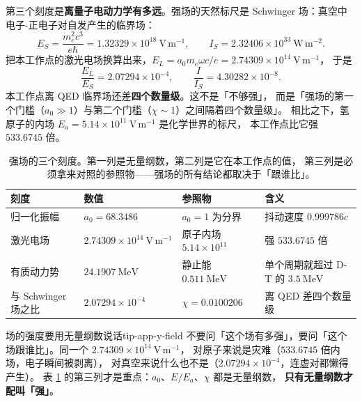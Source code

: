 第三个刻度是\textbf{离量子电动力学有多远}。强场的天然标尺是 Schwinger 场：真空中电子-正电子对自发产生的临界场：
\begin{equation}
E_S = \frac{m_e^2c^3}{e\hbar} = 1.32329\times10^{18}\ \mathrm{V\,m^{-1}},
\qquad
I_S = 2.32406\times10^{33}\ \mathrm{W\,m^{-2}}.
\label{eq:app-y-schwinger}
\end{equation}
把本工作点的激光电场换算出来，$E_L = a_0 m_e\omega c/e = 2.74309\times10^{14}\ \mathrm{V\,m^{-1}}$，
于是
\begin{equation}
\frac{E_L}{E_S} = 2.07294\times10^{-4},
\qquad
\frac{I}{I_S} = 4.30282\times10^{-8}.
\label{eq:app-y-ratio}
\end{equation}
本工作点离 QED 临界场还差\textbf{四个数量级}。这不是「不够强」，
而是「强场的第一个门槛（$a_0\gg1$）与第二个门槛（$\chi\sim1$）之间隔着四个数量级」。
相比之下，氢原子的内场 $E_a = 5.14\times10^{11}\ \mathrm{V\,m^{-1}}$ 是化学世界的标尺，
本工作点比它强 $533.6745$ 倍。

\begin{table}[htbp]
\centering
\small
\caption{强场的三个刻度。第一列是无量纲数，第二列是它在本工作点的值，
第三列是必须拿来对照的参照物——强场的所有结论都取决于「跟谁比」。}
\label{tab:app-y-scales}
\begin{tabular}{p{3.0cm}p{3.4cm}p{3.3cm}p{3.6cm}}
\toprule
刻度 & 数值 & 参照物 & 含义 \\
\midrule
归一化振幅 & $a_0 = 68.3486$ & $a_0=1$ 为分界 & 抖动速度 $0.999786c$ \\
激光电场 & $2.74309\times10^{14}\ \mathrm{V\,m^{-1}}$ & 原子内场 $5.14\times10^{11}$ & 强 $533.6745$ 倍 \\
有质动力势 & $24.1907\ \mathrm{MeV}$ & 静止能 $0.511\ \mathrm{MeV}$ & 单个周期就超过 D-T 的 $3.5\ \mathrm{MeV}$ \\
与 Schwinger 场之比 & $2.07294\times10^{-4}$ & $\chi = 0.0100206$ & 离 QED 差四个数量级 \\
\bottomrule
\end{tabular}

\end{table}

\begin{tip}{场的强度要用无量纲数说话}{tip-app-y-field}
不要问「这个场有多强」，要问「这个场跟谁比」。同一个 $2.74309\times10^{14}\ \mathrm{V\,m^{-1}}$，
对原子来说是灾难（$533.6745$ 倍内场，电子瞬间被剥离），
对真空来说什么也不是（$2.07294\times10^{-4}$，连虚对都懒得产生）。
表 \ref{tab:app-y-scales} 的第三列才是重点：$a_0$、$E/E_a$、$\chi$ 都是无量纲数，
\textbf{只有无量纲数才配叫「强」}。
\end{tip}

